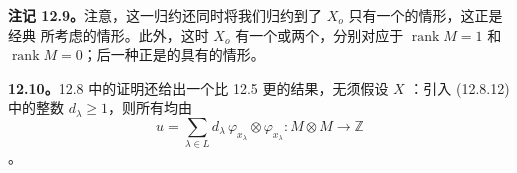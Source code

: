 \textbf{注记 12.9。}注意，这一归约还同时将我们归约到了 $X_o$ 只有一个的情形，这正是经典 所考虑的情形。此外，这时 $X_o$ 有一个或两个，分别对应于 $\operatorname{rank}M=1$ 和 $\operatorname{rank}M=0$；后一种正是的具有的情形。

\textbf{12.10。}12.8 中的证明还给出一个比 12.5 更的结果，无须假设 $X$ ：引入 (12.8.12) 中的整数 $d_\lambda\geq1$，则所有均由
\[
 u=\sum_{\lambda\in L}d_\lambda\,
 \varphi_{x_\lambda}\otimes\varphi_{x_\lambda}:
 M\otimes M\longrightarrow\mathbb Z\tag{12.10.1}
\]
。
